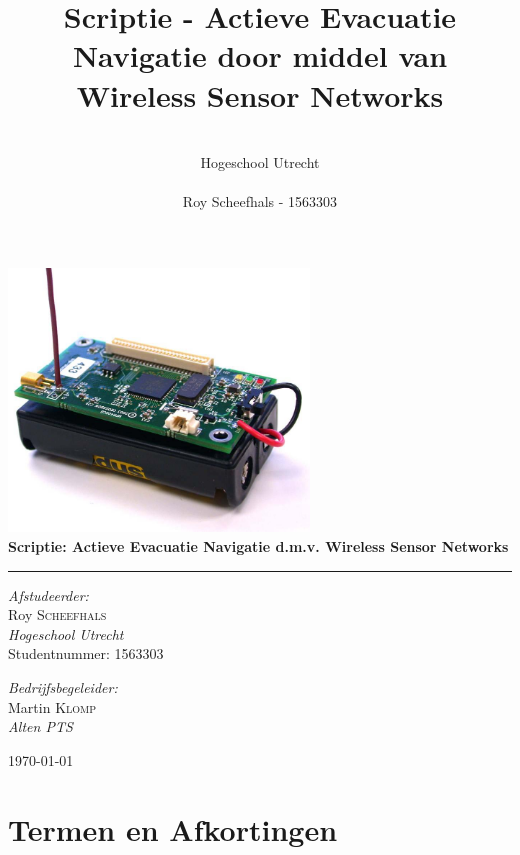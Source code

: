 \documentclass{../local}
\title{\textbf{Scriptie - Actieve Evacuatie Navigatie door middel van Wireless Sensor Networks}}
\author{\\
		Hogeschool Utrecht\\
		\\
		Roy Scheefhals - 1563303}
\begin{document}
\begin{titlepage}
\begin{center}

\includegraphics[width=0.6\textwidth]{../images/mica2}~\\[1cm]

{ \huge \bfseries Scriptie: Actieve Evacuatie Navigatie d.m.v. Wireless Sensor Networks\\[0.4cm] }
\hrule
\hspace{0pt} 
\vspace{\fill}

\begin{minipage}{0.4\textwidth}
\begin{flushleft} \large
\emph{Afstudeerder:}\\
Roy \textsc{Scheefhals}\\
\emph{Hogeschool Utrecht}\\
Studentnummer: 1563303\\
\end{flushleft}
\end{minipage}
\begin{minipage}{0.4\textwidth}
\begin{flushright} \large
\emph{Bedrijfsbegeleider:} \\
Martin \textsc{Klomp}\\
\emph{Alten PTS}
\end{flushright}
\end{minipage}

\end{center}
\today
\end{titlepage}

\renewcommand{\thesection}{\Roman{section}}
\newpage{}

\section{Termen en Afkortingen}

\end{document}
